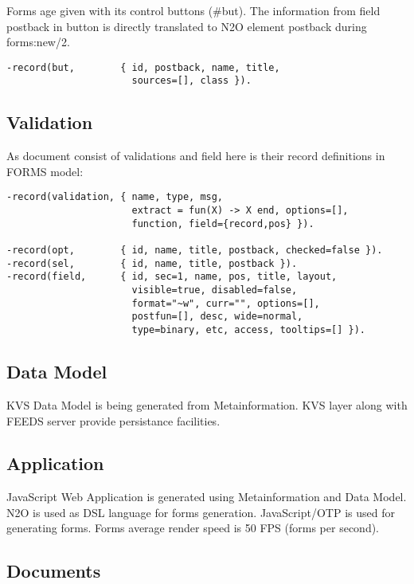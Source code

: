 Forms age given with its control buttons (\#but).
The information from field postback in button is directly translated
to N2O element postback during forms:new/2.

\vspace{1\baselineskip}
\begin{lstlisting}
-record(but,        { id, postback, name, title,
                      sources=[], class }).
\end{lstlisting}

\subsection{Validation}
As document consist of validations and field here is their
record definitions in FORMS model:

\vspace{1\baselineskip}
\begin{lstlisting}
-record(validation, { name, type, msg,
                      extract = fun(X) -> X end, options=[],
                      function, field={record,pos} }).

-record(opt,        { id, name, title, postback, checked=false }).
-record(sel,        { id, name, title, postback }).
-record(field,      { id, sec=1, name, pos, title, layout,
                      visible=true, disabled=false,
                      format="~w", curr="", options=[],
                      postfun=[], desc, wide=normal,
                      type=binary, etc, access, tooltips=[] }).
\end{lstlisting}

\subsection{Data Model}
KVS Data Model is being generated from Metainformation.
KVS layer along with FEEDS server provide persistance facilities.

\subsection{Application}
JavaScript Web Application is generated using Metainformation and Data Model.
N2O is used as DSL language for forms generation.
JavaScript/OTP is used for generating forms.
Forms average render speed is 50 FPS (forms per second).

\subsection{Documents}

